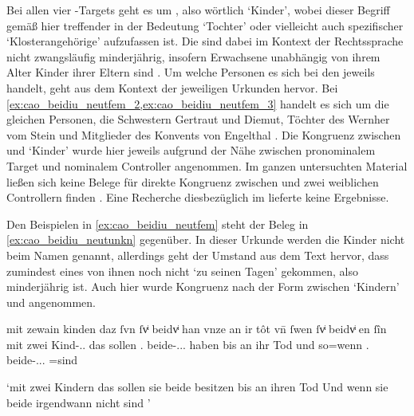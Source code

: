 Bei allen vier -Targets geht es um , also wörtlich
`Kinder', wobei dieser Begriff gemäß \citet[s.\,v.~]{lexer:mhdhwb}
hier treffender in der Bedeutung `Tochter'
 oder vielleicht
auch spezifischer `Klosterangehörige'
 aufzufassen ist.
Die  sind dabei im Kontext der Rechtssprache nicht zwangsläufig
minderjährig, insofern Erwachsene unabhängig von ihrem Alter Kinder ihrer
Eltern sind \autocites[vgl.][1736]{schwab2012}[siehe
auch][258--259]{birkenesfleischer2022}. Um welche Personen es sich bei den
 jeweils handelt, geht aus dem Kontext der jeweiligen Urkunden
hervor. Bei \cref{ex:cao_beidiu_neutfem_2,ex:cao_beidiu_neutfem_3} handelt es
sich um die gleichen Personen, die Schwestern Gertraut und Diemut, Töchter des
Wernher vom Stein und Mitglieder des Konvents von Engelthal
\autocite[Kr.~Nürnberger Land; vgl.][619]{caor}.
%
Die Kongruenz zwischen  und  `Kinder' wurde hier
jeweils aufgrund der Nähe zwischen pronominalem Target und nominalem Controller
angenommen. Im ganzen unter\-suchten Material ließen sich keine Belege für
direkte Kongruenz zwischen  und zwei weiblichen Controllern finden%
. Eine Recherche diesbezüglich im
\REM{} lieferte keine Ergeb\-nisse.

Den Beispielen in \cref{ex:cao_beidiu_neutfem} steht der Beleg in
\cref{ex:cao_beidiu_neutunkn} gegenüber. In dieser Urkunde werden die Kinder
nicht beim Namen genannt, allerdings geht der Umstand aus dem Text hervor, dass
zumindest eines von ihnen noch nicht  `zu seinen
Tagen' \autocites[\pno~214, 218.18--19]{cao1}[vgl.][26]{caor} gekommen, also
minderjährig ist. Auch hier wurde Kongruenz nach der Form zwischen
 `Kindern' und  angenommen.

\begin{exe}
\ex \label{ex:cao_beidiu_neutunkn}
	\gll mit zewain kinden \textelp{} daz ſvn ſvͥ
		beidvͥ han vnze an ir tôt \textelp{} vn̄ ſwen
		ſvͥ beidvͥ {en ſîn}
		\textelp{} \\
		mit zwei Kind-\Dat.\Pl.\NeutX{} {} das sollen
		\Tpl\tsub{\SX}.\Nom{} beide-\Nom.\Pl.\NeutX.\St{} haben bis an ihr
		Tod {} und so=wenn \Tpl\tsub{\SX}.\Nom{}
		beide-\Nom.\Pl.\NeutX.\St{} \Neg=sind {} \\
	\begin{taggedline}{\parencites(Rottweil, 1274)[\pno~214, 218.17--24]{cao1}}
	\trans `mit zwei Kindern \textelp{} das sollen sie beide besitzen
		bis an ihren Tod \textelp{} Und wenn sie beide irgendwann nicht
		 sind \textelp{}'
	\end{taggedline}
\end{exe}

